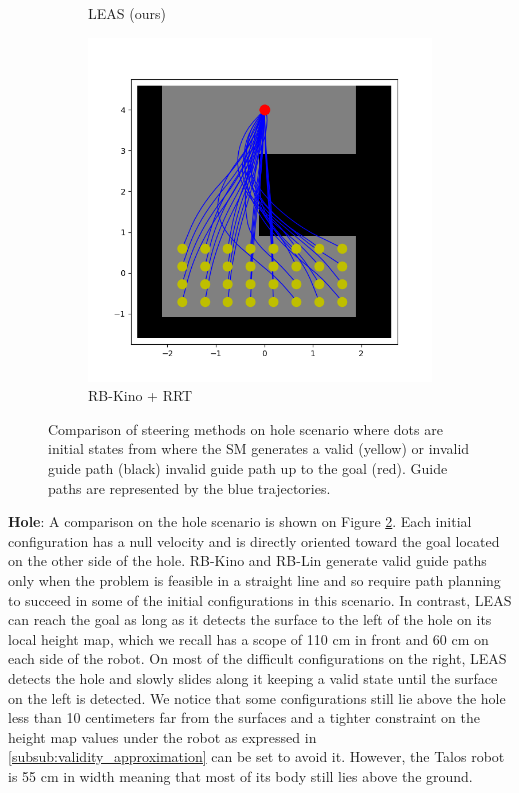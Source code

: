 \begin{figure}
\begin{subfigure}[t]{0.49\linewidth}
    \caption{LEAS (ours)}
    \end{subfigure}
    \begin{subfigure}[t]{0.49\linewidth}
    \includegraphics[width=\textwidth]{Figures/Chapter_LEAS/hole_p1_kino_rrt.png}
    \caption{RB-Kino + RRT}
    \label{fig:leas:hole_scenarios_Kino_RRT}
    \end{subfigure}
    \caption{Comparison of steering methods on hole scenario where dots are initial states from where the SM generates a valid (yellow) or invalid guide path (black) invalid guide path up to the goal (red). Guide paths are represented by the blue trajectories.}
    \label{fig:leas:hole_scenarios}
\end{figure}

\textbf{Hole}: A comparison on the hole scenario is shown on Figure \ref{fig:leas:hole_scenarios}. Each initial configuration has a null velocity and is directly oriented toward the goal located on the other side of the hole. 
RB-Kino and RB-Lin generate valid guide paths only when the problem is feasible in a straight line and so require path planning to succeed in some of the initial configurations in this scenario.
In contrast, LEAS can reach the goal as long as it detects the surface to the left of the hole on its local height map, which we recall has a scope of 110 cm in front and 60 cm on each side of the robot. 
On most of the difficult configurations on the right, LEAS detects the hole and slowly slides along it keeping a valid state until the surface on the left is detected.
We notice that some configurations still lie above the hole less than 10 centimeters far from the surfaces and a tighter constraint on the height map values under the robot as expressed in \ref{subsub:validity_approximation} can be set to avoid it. However, the Talos robot is 55 cm in width meaning that most of its body still lies above the ground.

